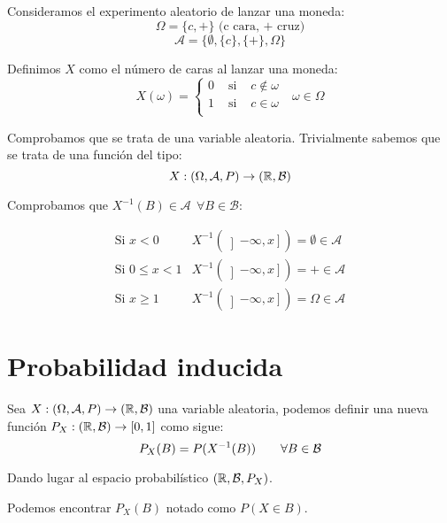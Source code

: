 \begin{ejemplo}
    Consideramos el experimento aleatorio de lanzar una moneda:
    $$\Omega = \{c, +\} \mbox{ (c cara, + cruz)}$$
    $$\mathcal{A} = \{\emptyset, \{c\}, \{+\}, \Omega \}$$
    
    Definimos $X$ como el número de caras al lanzar una moneda:
    $$X(\omega) = \left\{ \begin{array}{lcl}
        0 & \mbox{ si } & c \notin \omega \\
        1 & \mbox{ si } & c \in \omega    \\
      \end{array} \right.~~~\omega \in \Omega$$

    Comprobamos que se trata de una variable aleatoria. Trivialmente sabemos que se trata de una función del tipo:
    $$X : (\Omega, \mathcal{A}, P) \rightarrow (\mathbb R, \mathcal{B})$$
    
    Comprobamos que $X^{-1}(B) \in \mathcal{A}~~\forall B \in \mathcal{B}$:
    
    $$\begin{array}{ll}
        \mbox{Si } x<0       & X^{-1}(\left] -\infty, x \right] ) = \emptyset \in \mathcal{A} \\
        \mbox{Si } 0\leq x<1 & X^{-1}(\left] -\infty, x \right] ) = + \in \mathcal{A}         \\
        \mbox{Si } x\geq 1   & X^{-1}(\left] -\infty, x \right] ) = \Omega \in \mathcal{A}
      \end{array}$$
\end{ejemplo}

\section{Probabilidad inducida}
\begin{definicion}
    Sea $X:(\Omega, \mathcal{A}, P) \rightarrow (\mathbb R, \mathcal{B})$ una variable aleatoria, podemos definir una nueva función $P_X : (\mathbb R, \mathcal{B}) \rightarrow [0,1]$ como sigue:
    $$P_X(B) = P(X^{-1}(B)) \qquad \forall B \in \mathcal{B}$$
    
    Dando lugar al espacio probabilístico $(\mathbb R, \mathcal{B}, P_X)$.
\end{definicion}
\begin{notacion}
    Podemos encontrar $P_X(B)$ notado como $P(X \in B)$.
\end{notacion}


